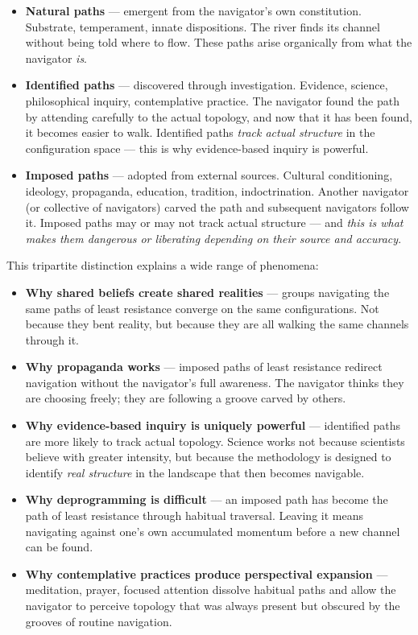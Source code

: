 \begin{itemize}[nosep,leftmargin=*]
  \item \textbf{Natural paths} — emergent from the navigator's own constitution. Substrate, temperament, innate dispositions. The river finds its channel without being told where to flow. These paths arise organically from what the navigator \textit{is}.
  \item \textbf{Identified paths} — discovered through investigation. Evidence, science, philosophical inquiry, contemplative practice. The navigator found the path by attending carefully to the actual topology, and now that it has been found, it becomes easier to walk. Identified paths \textit{track actual structure} in the configuration space — this is why evidence-based inquiry is powerful.
  \item \textbf{Imposed paths} — adopted from external sources. Cultural conditioning, ideology, propaganda, education, tradition, indoctrination. Another navigator (or collective of navigators) carved the path and subsequent navigators follow it. Imposed paths may or may not track actual structure — and \textit{this is what makes them dangerous or liberating depending on their source and accuracy}.
\end{itemize}


This tripartite distinction explains a wide range of phenomena:


\begin{itemize}[nosep,leftmargin=*]
  \item \textbf{Why shared beliefs create shared realities} — groups navigating the same paths of least resistance converge on the same configurations. Not because they bent reality, but because they are all walking the same channels through it.
  \item \textbf{Why propaganda works} — imposed paths of least resistance redirect navigation without the navigator's full awareness. The navigator thinks they are choosing freely; they are following a groove carved by others.
  \item \textbf{Why evidence-based inquiry is uniquely powerful} — identified paths are more likely to track actual topology. Science works not because scientists believe with greater intensity, but because the methodology is designed to identify \textit{real structure} in the landscape that then becomes navigable.
  \item \textbf{Why deprogramming is difficult} — an imposed path has become the path of least resistance through habitual traversal. Leaving it means navigating against one's own accumulated momentum before a new channel can be found.
  \item \textbf{Why contemplative practices produce perspectival expansion} — meditation, prayer, focused attention dissolve habitual paths and allow the navigator to perceive topology that was always present but obscured by the grooves of routine navigation.
\end{itemize}


